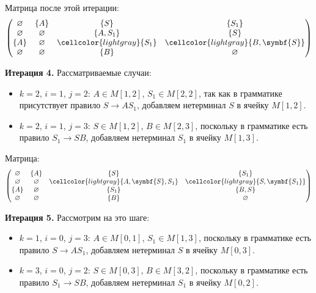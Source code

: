 \begin{example}
    Матрица после этой итерации:
    \[
        \begin{pmatrix}
            \varnothing & \{A\}       & \{S\}                        & \{S_1\}                               \\
            \varnothing & \varnothing & \{A, S_1\}                   & \{S\}                                 \\
            \{A\}       & \varnothing & \cellcolor{lightgray}\{S_1\} & \cellcolor{lightgray}\{B, \symbf{S}\} \\
            \varnothing & \varnothing & \{B\}                        & \varnothing
        \end{pmatrix}
    \]

    \textbf{Итерация 4.}
    Рассматриваемые случаи:
    \begin{itemize}
        \item $k = 2$, $i = 1$, $j = 2$: $A \in M[1, 2]$, $S_1 \in M[2, 2]$, так как в грамматике присутствует правило $S \to A S_1$, добавляем нетерминал $S$ в ячейку $M[1, 2]$.
        \item $k = 2$, $i = 1$, $j = 3$: $S \in M[1, 2]$, $B \in M[2, 3]$, поскольку в грамматике есть правило $S_1 \to S B$, добавляем нетерминал $S_1$ в ячейку $M[1, 3]$.
    \end{itemize}

    Матрица:
    \[
        \begin{pmatrix}
            \varnothing & \{A\}       & \{S\}                                      & \{S_1\}                                 \\
            \varnothing & \varnothing & \cellcolor{lightgray}\{A, \symbf{S}, S_1\} & \cellcolor{lightgray}\{S, \symbf{S_1}\} \\
            \{A\}       & \varnothing & \{S_1\}                                    & \{B, S\}                                \\
            \varnothing & \varnothing & \{B\}                                      & \varnothing
        \end{pmatrix}
    \]

    \textbf{Итерация 5.}
    Рассмотрим на это шаге:
    \begin{itemize}
        \item $k = 1$, $i = 0$, $j = 3$: $A \in M[0, 1]$, $S_1 \in M[1, 3]$, поскольку в грамматике есть правило $S \to A S_1$, добавляем нетерминал $S$ в ячейку $M[0, 3]$.
        \item $k = 3$, $i = 0$, $j = 2$: $S \in M[0, 3]$, $B \in M[3, 2]$, поскольку в грамматике есть правило $S_1 \to S B$, добавляем нетерминал $S_1$ в ячейку $M[0, 2]$.
    \end{itemize}


\end{example}
